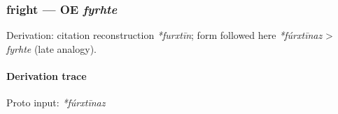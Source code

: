 \documentclass[
  british,
  a4paper,
]{article}
\begin{document}
\subsubsection{\texorpdfstring{fright --- OE
\emph{fyrhte}}{fright --- OE fyrhte}}\label{fright-oe-fyrhte}

Derivation: citation reconstruction \emph{*furxtīn}; form followed here
\emph{*fúrxtīnaz} \textgreater{} \emph{fyrhte} (late analogy).

\paragraph{Derivation trace}\label{derivation-trace-153}

Proto input: \emph{*fúrxtīnaz}

\begingroup
\setlength{\fboxsep}{6pt}
\end{document}
